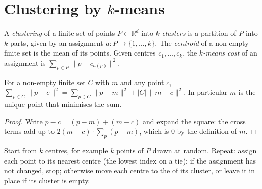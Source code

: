 \section{Clustering by $k$-means}\label{sec:b2:trees-and-clustering:kmeans}


\begin{definition}\label{def:b2:trees-and-clustering:clustering}
A \emph{clustering} of a finite set of points $P \subset \mathbb{R}^d$ into $k$ \emph{clusters} is a
partition of $P$ into $k$ parts, given by an assignment $a : P \to \{1, \dots, k\}$. The \emph{centroid}
of a non-empty finite set is the mean of its points. Given centres $c_1, \dots, c_k$, the \emph{$k$-means
cost} of an assignment is $\sum_{p \in P} \lVert p - c_{a(p)} \rVert^2$.
\end{definition}

\begin{lemma}\label{lem:b2:trees-and-clustering:centroid}
For a non-empty finite set $C$ with  $m$ and any point $c$, $\sum_{p \in C} \lVert p - c \rVert^2 = \sum_{p \in C}
\lVert p - m \rVert^2 + |C|\,\lVert m - c \rVert^2$. In particular $m$ is the unique point that minimises the sum.
\end{lemma}

\begin{proof}
Write $p - c = (p - m) + (m - c)$ and expand the square: the cross terms add up to $2 (m - c) \cdot \sum_{p}(p - m)$,
which is $0$ by the definition of $m$.
\end{proof}

\begin{method}\label{met:b2:trees-and-clustering:lloyd}
Start from $k$ centres, for example $k$ points of $P$ drawn at random. Repeat: assign each point to its nearest centre
(the lowest index on a tie); if the assignment has not changed, stop; otherwise move each centre to the  of its
cluster, or leave it in place if its cluster is empty.
\end{method}

